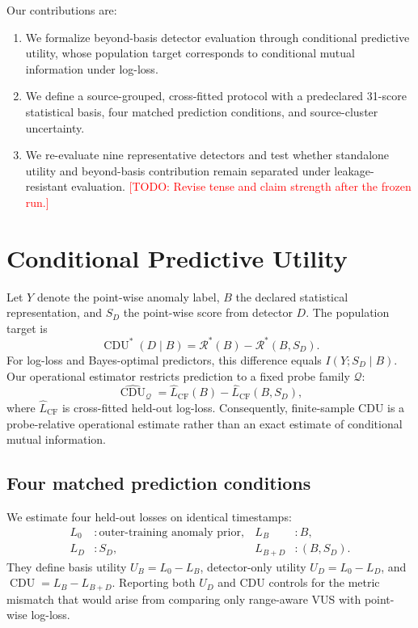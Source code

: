 \documentclass[conference]{IEEEtran}
\newcommand{\CDU}{\operatorname{CDU}}
\newcommand{\Risk}{\mathcal{R}}
\newcommand{\todo}[1]{\textcolor{red}{[TODO: #1]}}
\begin{document}
Our contributions are:
\begin{enumerate}
    \item We formalize beyond-basis detector evaluation through conditional predictive utility, whose population target corresponds to conditional mutual information under log-loss.
    \item We define a source-grouped, cross-fitted protocol with a predeclared 31-score statistical basis, four matched prediction conditions, and source-cluster uncertainty.
    \item We re-evaluate nine representative detectors and test whether standalone utility and beyond-basis contribution remain separated under leakage-resistant evaluation. \todo{Revise tense and claim strength after the frozen run.}
\end{enumerate}

\section{Conditional Predictive Utility}
Let $Y$ denote the point-wise anomaly label, $B$ the declared statistical representation, and $S_D$ the point-wise score from detector $D$. The population target is
\begin{equation}
\CDU^{*}(D\mid B)=\Risk^{*}(B)-\Risk^{*}(B,S_D).
\end{equation}
For log-loss and Bayes-optimal predictors, this difference equals $I(Y;S_D\mid B)$. Our operational estimator restricts prediction to a fixed probe family $\mathcal Q$:
\begin{equation}
\widehat{\CDU}_{\mathcal Q}
=\widehat L_{\mathrm{CF}}(B)-\widehat L_{\mathrm{CF}}(B,S_D),
\end{equation}
where $\widehat L_{\mathrm{CF}}$ is cross-fitted held-out log-loss. Consequently, finite-sample CDU is a probe-relative operational estimate rather than an exact estimate of conditional mutual information.

\subsection{Four matched prediction conditions}
We estimate four held-out losses on identical timestamps:
\begin{align}
L_0 &: \text{outer-training anomaly prior}, &
L_B &: B,\\
L_D &: S_D, &
L_{B+D} &: (B,S_D).
\end{align}
They define basis utility $U_B=L_0-L_B$, detector-only utility $U_D=L_0-L_D$, and $\CDU=L_B-L_{B+D}$. Reporting both $U_D$ and CDU controls for the metric mismatch that would arise from comparing only range-aware VUS with point-wise log-loss.
\end{document}
